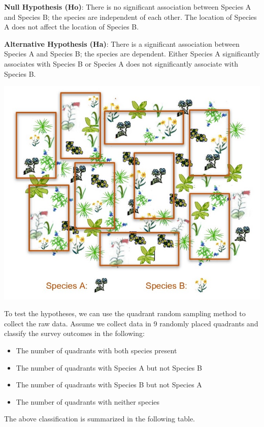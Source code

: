 \documentclass[
]{book}
\providecommand{\tightlist}{%
  \setlength{\itemsep}{0pt}\setlength{\parskip}{0pt}}
\begin{document}
\textbf{Null Hypothesis (Ho)}: There is no significant association between Species A and Species B; the species are independent of each other. The location of Species A does not affect the location of Species B.

\textbf{Alternative Hypothesis (Ha)}: There is a significant association between Species A and Species B; the species are dependent. Either Species A significantly associates with Species B or Species A does not significantly associate with Species B.

\begin{center}\includegraphics[width=0.8\linewidth]{img12/w12-QuadrantSurvey} \end{center}

To test the hypotheses, we can use the quadrant random sampling method to collect the raw data. Assume we collect data in 9 randomly placed quadrants and classify the survey outcomes in the following:

\begin{itemize}
\tightlist
\item
  The number of quadrants with both species present
\item
  The number of quadrants with Species A but not Species B
\item
  The number of quadrants with Species B but not Species A
\item
  The number of quadrants with neither species
\end{itemize}

The above classification is summarized in the following table.
\end{document}

